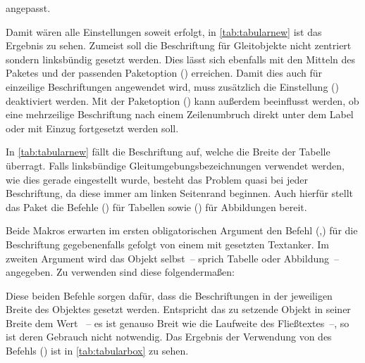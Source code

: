 \documentclass[%
  english,ngerman,%
  cdgeometry=no,DIV=12,automark%
]{tudscrartcl}
\begin{document}
angepasst.
%
\begin{Preamble*}
\end{Preamble*}
%
\begin{table}
\end{table}%
%
Damit wären alle Einstellungen soweit erfolgt, in \autoref{tab:tabularnew} ist 
das Ergebnis zu sehen. Zumeist soll die Beschriftung für Gleitobjekte nicht 
zentriert sondern linksbündig gesetzt werden. Dies lässt sich ebenfalls mit den 
Mitteln des Paketes  und der passenden Paketoption 
() erreichen. Damit dies auch für 
einzeilige Beschriftungen angewendet wird, muss zusätzlich die Einstellung 
() deaktiviert werden. Mit der 
Paketoption () kann außerdem beeinflusst 
werden, ob eine mehrzeilige Beschriftung nach einem Zeilenumbruch direkt unter 
dem Label oder mit Einzug fortgesetzt werden soll.
%
\begin{Preamble*}
\captionsetup{singlelinecheck=off,format=hang,justification=raggedright}
\end{Preamble*}
%
In \autoref{tab:tabularnew} fällt die Beschriftung auf, welche die Breite der 
Tabelle überragt. Falls linksbündige Gleitumgebungsbezeichnungen verwendet 
werden, wie dies gerade eingestellt wurde, besteht das Problem quasi bei jeder 
Beschriftung, da diese immer am linken Seitenrand beginnen. Auch hierfür stellt 
das Paket  die Befehle () 
für Tabellen sowie () für Abbildungen bereit. 

Beide Makros erwarten im ersten obligatorischen Argument den Befehl 
(,) für die Beschriftung 
gegebenenfalls gefolgt von einem mit  gesetzten Textanker. Im 
zweiten Argument wird das Objekt selbst~-- sprich Tabelle oder Abbildung~-- 
angegeben. Zu verwenden sind diese folgendermaßen:
%
%
Diese beiden Befehle sorgen dafür, dass die Beschriftungen in der jeweiligen 
Breite des Objektes gesetzt werden. Entspricht das zu setzende Objekt in seiner 
Breite dem Wert ~-- es ist genauso Breit wie die Laufweite 
des Fließtextes~--, so ist deren Gebrauch nicht notwendig. Das Ergebnis der 
Verwendung von des Befehls () ist in 
\autoref{tab:tabularbox} zu sehen.
\end{document}
